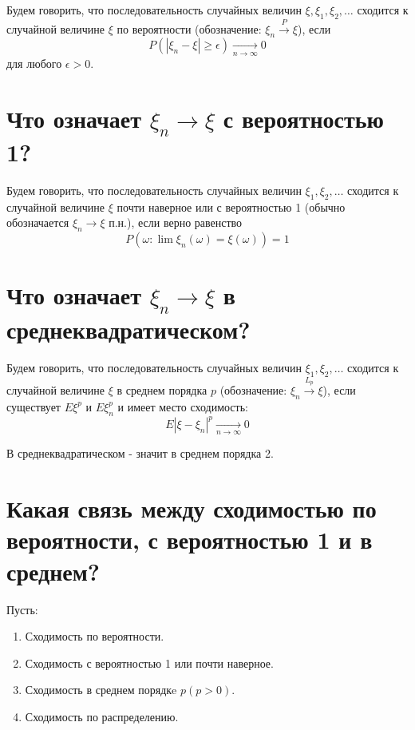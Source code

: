 Будем говорить, что последовательность случайных величин $\xi, \xi_1, \xi_2, \dots$ сходится к случайной величине $\xi$ по вероятности (обозначение: $\xi_n \overset{P}{\to} \xi$), если
\[ P(|\xi_n - \xi| \ge \epsilon) \underset{n \to \infty}{\to} 0 \]
для любого $\epsilon > 0$.

\section{Что означает $\xi_n \to \xi$ с вероятностью 1?}

Будем говорить, что последовательность случайных величин $\xi_1, \xi_2, \dots$ сходится к случайной величине $\xi$ почти наверное или с вероятностью 1 (обычно обозначается $\xi_n \to \xi$ п.н.), если верно равенство
\[ P(\omega : \lim \xi_n (\omega) = \xi (\omega)) = 1 \]

\section{Что означает $\xi_n \to \xi$ в среднеквадратическом?}

Будем говорить, что последовательность случайных величин $\xi_1, \xi_2, \dots$ сходится к случайной величине $\xi$ в среднем порядка $p$ (обозначение: $\xi_n \overset{L_p}{\to} \xi$), если существует $E\xi^p$ и $E\xi_n^p$ и имеет место сходимость:
\[ E |\xi - \xi_n|^p \underset{n \to \infty}{\to} 0 \]

В среднеквадратическом - значит в среднем порядка 2.

\section{Какая связь между сходимостью по вероятности, с вероятностью 1 и в среднем?}

Пусть:
\begin{enumerate}
	\item Сходимость по вероятности.
	\item Сходимость с вероятностью 1 или почти наверное.
	\item Сходимость в среднем порядкe $p(p > 0)$.
	\item Сходимость по распределению.
\end{enumerate}

